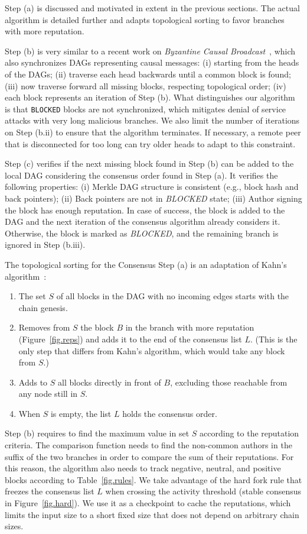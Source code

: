 \documentclass[10pt,journal,compsoc]{IEEEtran}
\newcommand{\code}[1]  {\texttt{\footnotesize{#1}}}
\begin{document}
Step (a) is discussed and motivated in extent in the previous sections.
The actual algorithm is detailed further and adapts topological sorting to
favor branches with more reputation.

Step (b) is very similar to a recent work on \emph{Byzantine Causal
Broadcast}~\cite{p2p.dag.sync}, which also synchronizes DAGs representing
causal messages:
    (i)   starting from the heads of the DAGs;
    (ii)  traverse each head backwards until a common block is found;
    (iii) now traverse forward all missing blocks, respecting topological order;
    (iv)  each block represents an iteration of Step (b).
What distinguishes our algorithm is that \code{BLOCKED} blocks are not
synchronized, which mitigates denial of service attacks with very long
malicious branches.
We also limit the number of iterations on Step (b.ii) to ensure that the
algorithm terminates.
If necessary, a remote peer that is disconnected for too long can try older
heads to adapt to this constraint.

Step (c) verifies if the next missing block found in Step (b) can be added to
the local DAG considering the consensus order found in Step (a).
It verifies the following properties:
    (i)   Merkle DAG structure is consistent (e.g., block hash and back pointers);
    (ii)  Back pointers are not in \emph{BLOCKED} state;
    (iii) Author signing the block has enough reputation.
In case of success, the block is added to the DAG and the next iteration of the
consensus algorithm already considers it.
Otherwise, the block is marked as \emph{BLOCKED}, and the remaining branch is
ignored in Step (b.iii).

The topological sorting for the Consensus Step (a) is an adaptation of Kahn's
algorithm~\cite{kahn}:
%
\begin{enumerate}
\item The set $S$ of all blocks in the DAG with no incoming edges starts with
      the chain genesis.
\item Removes from $S$ the block $B$ in the branch with more reputation
      (Figure~\ref{fig.reps}) and adds it to the end of the consensus list $L$.
      (This is the only step that differs from Kahn's algorithm, which would
      take any block from $S$.)
\item Adds to $S$ all blocks directly in front of $B$, excluding those
      reachable from any node still in $S$.
\item When $S$ is empty, the list $L$ holds the consensus order.
\end{enumerate}
%
Step (b) requires to find the maximum value in set $S$ according to the
reputation criteria.
The comparison function needs to find the non-common authors in the suffix of
the two branches in order to compare the sum of their reputations.
%
For this reason, the algorithm also needs to track negative, neutral, and
positive blocks according to Table~\ref{fig.rules}.
%
We take advantage of the hard fork rule that freezes the consensus list $L$
when crossing the activity threshold (stable consensus in Figure~\ref{fig.hard}).
We use it as a checkpoint to cache the reputations, which limits the input size
to a short fixed size that does not depend on arbitrary chain sizes.
\end{document}
